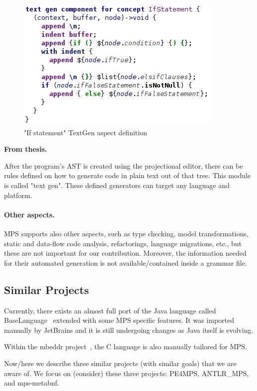 \documentclass[10pt]{sigplanconf}
\newcommand{\todo}[1]{{\bfseries #1}}
\begin{document}
\begin{figure}[ht]
	\centering
	\includegraphics[scale=0.6]{./images/if_statement_textgen.png}
	\caption{"If statement" TextGen aspect definition}
	\label{fig:if_statement_textgen}
\end{figure}

\todo{From thesis.

After the program's AST is created using the projectional editor, there can be rules defined on how to generate code in plain text out of that tree.
This module is called "text gen".
These defined generators can target any language and platform.

\paragraph{Other aspects.}
MPS supports also other aspects, such as type checking, model transformations, static and data-flow code analysis, refactorings, language migrations, etc., but these are not important for our contribution. Moreover, the information needed for their automated generation is not available/contained inside a grammar file.

}

\subsection{Similar Projects}

Currently, there exists an almost full port of the Java language called BaseLanguage~\cite{ref:BaseLanguage} extended with some MPS specific features.
It was imported manually by JetBrains and it is still undergoing changes as Java itself is evolving.

Within the mbeddr project~\cite{ref:mbeddr}, the C language is also manually tailored for MPS.

Now/here we describe three similar projects (with similar goals) that we are aware of.
We focus on (consider) these three projects: PE4MPS, ANTLR{\_}MPS, and mps-metabnf.
\end{document}
